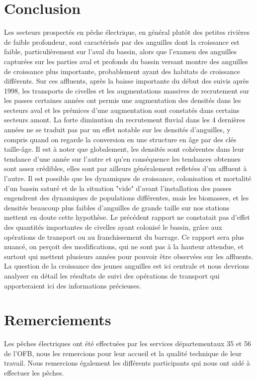 \documentclass[10pt,twocolumn,titlepage,twoside]{article}\usepackage[]{graphicx}\usepackage[]{xcolor}
\begin{document}
\section[Conclusion]{Conclusion}
Les secteurs prospectés en pêche électrique, en général plutôt des petites
rivières de faible profondeur, sont caractérisés par des anguilles dont la
croissance est faible, particulièrement sur l'aval du bassin, 
alors que l'examen des anguilles capturées sur les parties aval et profonds du bassin
versant montre des anguilles de croissance plus importante, probablement ayant
des habitats de croissance différents. Sur ces affluents, après la baisse
importante du début des suivis après 1998, les transports de civelles et les
augmentations massives de recrutement sur les passes certaines années ont permis
une augmentation des densités dans les secteurs aval et les prémices d'une
augmentation sont constatés dans certains secteurs amont. 
La forte diminution du recrutement fluvial dans les 4 dernières années ne se
traduit pas par un effet notable sur les densités d'anguilles, y compris quand
on regarde la conversion en une structure en âge par des clés taille-âge.
Il est à noter que globalement, les densités sont cohérentes dans leur tendance d'une année sur 
l'autre et qu'en conséquence les tendances
obtenues sont assez crédibles, elles sont par ailleurs généralement refletées
d'un affluent à l'autre.
Il est possible que les dynamiques de croissance, colonisation et mortalité d'un
bassin saturé et de la situation "vide" d'avant l'installation des passes
engendrent des dynamiques de populations différentes, mais les biomasses, et les
densités beaucoup plus faibles d'anguilles de grande taille sur nos stations
mettent en doute cette hypothèse.
Le précédent rapport ne constatait pas d'effet des quantités importantes de
civelles ayant colonisé le bassin, grâce aux opérations de transport ou au
franchissement du barrage. Ce rapport sera plus nuancé, on perçoit des
modifications, qui ne sont pas à la hauteur attendue, et surtout qui mettent
plusieurs années pour pouvoir être observées sur les affluents. La question de
la croissance des jeunes anguilles est ici centrale et nous devrions analyser
en détail les résultats de suivi des opérations de transport qui apporteraient
ici des informations précieuses. 

\section*{Remerciements} 
Les pêches électriques ont été effectuées par les services départementaux 35 et
56 de l'OFB, nous les remercions pour leur accueil et la qualité technique de
leur travail.
Nous remercions également les différents participants qui nous ont aidé à
effectuer les pêches.
\clearpage
\onecolumn
\printbibliography
\normalsize
\clearpage
\end{document}

